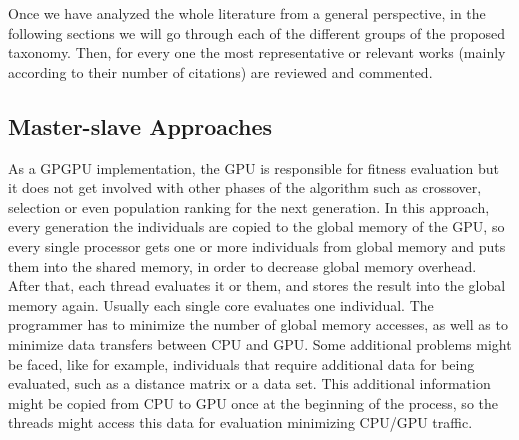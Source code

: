 \documentclass{article}
\begin{document}
Once we have analyzed the whole literature from a general perspective, in the following sections we will go through each of the different groups of the proposed taxonomy. Then, for every one the most representative or relevant works (mainly according to their number of citations) are reviewed and commented.


\subsection{Master-slave Approaches}
\label{sec:masterSlave}

As a GPGPU implementation, the GPU is responsible for fitness
evaluation but it does not get involved with other phases of the
algorithm such as crossover, selection or even population ranking for
the next generation. In this approach, every generation the
individuals are copied to the global memory of the GPU, so every
single processor gets one or more individuals from global memory and
puts them into the shared memory, in order to decrease global memory
overhead. After that, each thread evaluates it or them, and stores the
result into the global memory again. Usually each single core
evaluates one individual. The programmer has to minimize the number of
global memory accesses, as well as to minimize data transfers between
CPU and GPU. Some additional problems might be faced, like for
example, individuals that require additional data for being evaluated,
such as a distance matrix or a data set. This additional information
might be copied from CPU to GPU once at the beginning of the process,
so the threads might access this data for evaluation minimizing CPU/GPU 
traffic.
\end{document}
